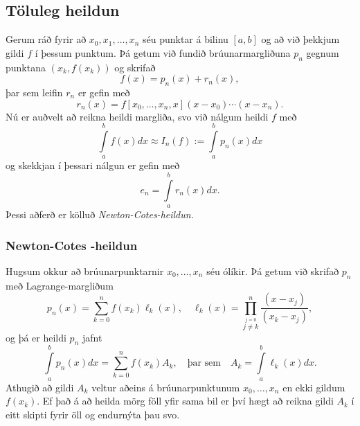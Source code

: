 \documentclass[icelandic,a4paper,12pt]{article}
\begin{document}
\subsection{Töluleg heildun} 
Gerum ráð fyrir að $x_0,x_1, \ldots, x_n$ séu punktar á bilinu $[a,b]$
og að við þekkjum gildi $f$ í þessum punktum. Þá getum við fundið
brúunarmargliðuna $p_n$ gegnum punktana $(x_k,f(x_k))$ og skrifað 
\begin{equation*}
  f(x) = p_n(x) + r_n(x),
\end{equation*} 
þar sem leifin $r_n$ er gefin með
\begin{equation*}
  r_n(x) = f[x_0,\ldots,x_n,x](x-x_0)\cdots(x-x_n).
\end{equation*}
\pause
Nú er auðvelt að reikna heildi margliða, svo við nálgum heildi $f$ með
\begin{equation*}
  \int\limits_a^b f(x) dx \approx 
  I_n(f) := \int\limits_a^b p_n(x) dx
\end{equation*}
\pause
og skekkjan í þessari nálgun er gefin með
\begin{equation*}
  e_n = \int\limits_a^b r_n(x) dx.
\end{equation*}
Þessi aðferð er kölluð {\it Newton-Cotes-heildun}. 



\subsubsection{Newton-Cotes -heildun} 
Hugsum okkur að brúunarpunktarnir $x_0, \ldots, x_n$ séu ólíkir. Þá
getum við skrifað $p_n$ með Lagrange-margliðum 
\begin{equation*}
  p_n(x) = \sum\limits_{k=0}^n f(x_k) \ell_k(x),
  \quad
  \ell_k(x) = \prod\limits_{\stackrel{j=0}{j \not= k}}^n
  \frac{(x-x_j)}{(x_k-x_j)},
\end{equation*}
\pause
og þá er heildi $p_n$ jafnt
\begin{equation*}
  \int\limits_a^b p_n(x) dx = 
  \sum\limits_{k=0}^n f(x_k) A_k,
  \quad \text{þar sem} \quad
  A_k = \int\limits_a^b \ell_k(x) dx.
\end{equation*}
\pause
Athugið að gildi $A_k$ veltur aðeins á brúunarpunktunum $x_0, \ldots,
x_n$ en ekki gildum $f(x_k)$. Ef það á að heilda mörg föll yfir sama
bil er því hægt að reikna gildi $A_k$ í eitt skipti fyrir öll og
endurnýta þau svo. 
\end{document}
